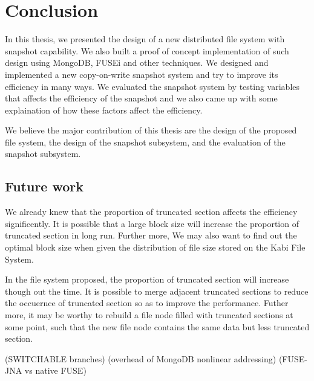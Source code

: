 \chapter{Conclusion}
\label{chap:conclusion}

    In this thesis, we presented the design of a new distributed file system with snapshot capability. We also built a proof of concept implementation of such design using MongoDB, FUSEi and other techniques. We designed and implemented a new copy-on-write snapshot system and try to improve its efficiency in many ways. We evaluated the snapshot system by testing variables that affects the efficiency of the snapshot and we also came up with some explaination of how these factors affect the efficiency.

    We believe the major contribution of this thesis are the design of the proposed file system, the design of the snapshot subsystem, and the evaluation of the snapshot subsystem.

\section{Future work}

     We already knew that the proportion of truncated section affects the efficiency significently. It is possible that a large block size will increase the proportion of truncated section in long run. Further more, We may also want to find out the optimal block size when given the distribution of file size stored on the Kabi File System.

     In the file system proposed, the proportion of truncated section will increase though out the time. It is possible to merge adjacent truncated sections to reduce the occuernce of truncated section so as to improve the performance. Futher more, it may be worthy to rebuild a file node filled with truncated sections at some point, such that the new file node contains the same data but less truncated section.

     (SWITCHABLE branches)
     (overhead of MongoDB nonlinear addressing)
     (FUSE-JNA vs native FUSE)

